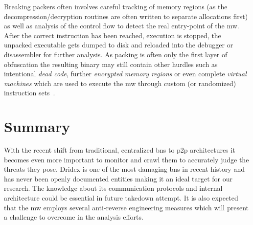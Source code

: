 Breaking packers often involves careful tracking of memory regions (as the decompression/decryption routines are often written to separate allocations first) as well as analysis of the control flow to detect the real entry-point of the \gls{mw}.
After the correct instruction has been reached, execution is stopped, the unpacked executable gets dumped to disk and reloaded into the debugger or disassembler for further analysis.
As packing is often only the first layer of obfuscation the resulting binary may still contain other hurdles such as intentional \emph{dead code}, further \emph{encrypted memory regions} or even complete \emph{virtual machines} which are used to execute the \gls{mw} through custom (or randomized) instruction sets~\cite{you2010malware}.

\section{Summary\label{sec:Related_work::Summary}}
With the recent shift from traditional, centralized \glspl{bn} to \gls{p2p} architectures it becomes even more important to monitor and crawl them to accurately judge the threats they pose.
Dridex is one of the most damaging \glspl{bn} in recent history and has never been openly documented entities making it an ideal target for our research.
The knowledge about its communication protocols and internal architecture could be essential in future takedown attempt.
It is also expected that the \gls{mw} employs several anti-reverse engineering measures which will present a challenge to overcome in the analysis efforts.
